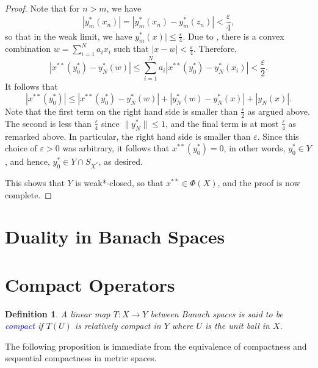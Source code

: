 \documentclass[11pt]{article}
\theoremstyle{thmstyle}
\theoremstyle{defstyle}
\newtheorem{definition}[theorem]{Definition}
\newcommand{\define}[1]{\textcolor{blue}{\textit{#1}}}
\renewcommand{\le}{\leqslant}
\begin{document}
\begin{proof}
    Note that for $n > m$, we have 
    \begin{equation*}
        |y_m^\ast(x_n)| = |y_m^\ast(x_n) - y_m^\ast(z_n)| < \frac{\varepsilon}{4},
    \end{equation*}
    so that in the weak limit, we have $y_m^\ast(x)|\le\frac{\varepsilon}{4}$. Due to , there is a convex combination $w = \displaystyle\sum_{i = 1}^N a_i x_i$ such that $|x - w| < \frac{\varepsilon}{4}$. Therefore, 
    \begin{equation*}
        |x^{\ast\ast}(y_0^\ast) - y_N^\ast(w)|\le\sum_{i = 1}^N a_i|x^{\ast\ast}(y_0^\ast) - y_N^\ast(x_i)| < \frac{\varepsilon}{2}.
    \end{equation*}
    It follows that 
    \begin{equation*}
        |x^{\ast\ast}(y_0^\ast)|\le |x^{\ast\ast}(y_0^\ast) - y_N^\ast(w)| + |y_N^\ast(w) - y_N^\ast(x)| + |y_N(x)|.
    \end{equation*}
    Note that the first term on the right hand side is smaller than $\frac{\varepsilon}{2}$ as argued above. The second is less than $\frac{\varepsilon}{4}$ since $\|y_N^\ast\|\le 1$, and the final term is at most $\frac{\varepsilon}{4}$ as remarked above. In particular, the right hand side is smaller than $\varepsilon$. Since this choice of $\varepsilon > 0$ was arbitrary, it follows that $x^{\ast\ast}(y_0^\ast) = 0$, in other words, $y_0^\ast\in Y$, and hence, $y_0^\ast\in Y\cap S_{X^\ast}$, as desired.

    This shows that $Y$ is weak*-closed, so that $x^{\ast\ast}\in\Phi(X)$, and the proof is now complete.
\end{proof}


\section{Duality in Banach Spaces}



\section{Compact Operators}

\begin{definition}
    A linear map $T: X\to Y$ between Banach spaces is said to be \define{compact} if $T(U)$ is relatively compact in $Y$ where $U$ is the unit ball in $X$.
\end{definition}

The following proposition is immediate from the equivalence of compactness and sequential compactness in metric spaces.
\end{document}

